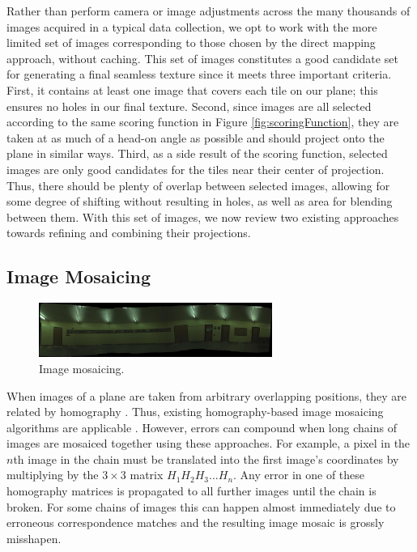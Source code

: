 \message{ !name(paper.tex)}\documentclass[10pt,twocolumn,letterpaper]{article}
\begin{document}
Rather than perform camera or image adjustments across the many
thousands of images acquired in a typical data collection, we opt to
work with the more limited set of images corresponding to those chosen
by the direct mapping approach, without caching. This set of images
constitutes a good candidate set for generating a final seamless
texture since it meets three important criteria. First, it contains at least one image that covers each tile on our
plane; this ensures no holes in our final texture. Second, since
images are all selected according to the same scoring function in
Figure \ref{fig:scoringFunction}, they are taken at as much of a head-on angle as possible and should project
onto the plane in similar ways. Third, as a side result of the scoring
function, selected images are only good candidates for the tiles near
their center of projection. Thus, there should be plenty of overlap
between selected images, allowing for some degree of shifting without
resulting in holes, as well as area for blending between them. With
this set of images, we now review two existing approaches towards refining and
combining their projections.

\subsection{Image Mosaicing}
\label{sec:imageMosaicing}
\begin{figure}
  \centering
  \includegraphics[width=3in]{panoMy.jpg}
  \caption{Image mosaicing. }
  \label{fig:mosaic}
\end{figure}


When images of a plane are taken from arbitrary overlapping positions,
they are related by homography \cite{hz}. Thus, existing
homography-based image mosaicing algorithms are applicable
\cite{brown2007automatic}. However, errors can compound when long
chains of images are mosaiced together using these approaches. For
example, a pixel in the $n$th image in the chain must be translated
into the first image's coordinates by multiplying by the $3\times3$
matrix $H_1 H_2 H_3 ... H_n$. Any error in one of these homography
matrices is propagated to all further images until the chain is
broken. For some chains of images this can happen almost immediately
due to erroneous correspondence matches and the resulting image mosaic
is grossly misshapen.
\end{document}
